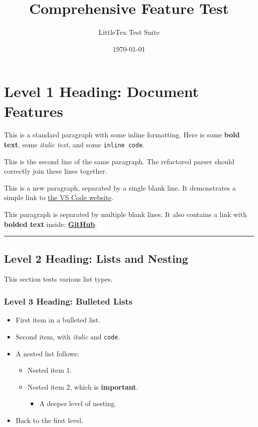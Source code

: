 \documentclass{article}
\title{Comprehensive Feature Test}
\author{LittleTex Test Suite}
\date{\today}
\begin{document}
\maketitle


\section{Level 1 Heading: Document Features}


This is a standard paragraph with some inline formatting. Here is some \textbf{bold text}, some \textit{italic text}, and some \texttt{inline code}.

This is the second line of the same paragraph. The refactored parser should correctly join these lines together.

This is a new paragraph, separated by a single blank line. It demonstrates a simple link to \href{https://code.visualstudio.com/}{the VS Code website}.

This paragraph is separated by multiple blank lines.
It also contains a link with \textbf{bolded text} inside: \href{https://github.com}{\textbf{GitHub}}.

\vspace{0.3cm}
\noindent\hrule
\vspace{0.3cm}

\subsection{Level 2 Heading: Lists and Nesting}


This section tests various list types.

\subsubsection{Level 3 Heading: Bulleted Lists}


\begin{itemize}
\item First item in a bulleted list.
\item Second item, with \textit{italic} and \texttt{code}.
\item A nested list follows:
\begin{itemize}
\item Nested item 1.
\item Nested item 2, which is \textbf{important}.
\begin{itemize}
\item A deeper level of nesting.
\end{itemize}

\end{itemize}

\item Back to the first level.
\end{itemize}
\end{document}

